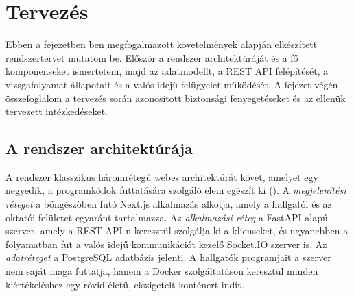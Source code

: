 \chapter{Tervezés}
\label{ch:tervezes}

Ebben a fejezetben ben megfogalmazott követelmények alapján elkészített
rendszertervet mutatom be. Először a rendszer architektúráját és a fő komponenseket ismertetem,
majd az adatmodellt, a REST API felépítését, a vizsgafolyamat állapotait és a valós idejű
felügyelet működését. A fejezet végén összefoglalom a tervezés során azonosított biztonsági
fenyegetéseket és az ellenük tervezett intézkedéseket.

\section{A rendszer architektúrája}
\label{sec:architektura}

A rendszer klasszikus háromrétegű webes architektúrát követ, amelyet egy negyedik, a programkódok
futtatására szolgáló elem egészít ki (). A \textit{megjelenítési réteget} a
böngészőben futó Next.js alkalmazás alkotja, amely a hallgatói és az oktatói felületet egyaránt
tartalmazza. Az \textit{alkalmazási réteg} a FastAPI alapú szerver, amely a REST API-n keresztül
szolgálja ki a klienseket, és ugyanebben a folyamatban fut a valós idejű kommunikációt kezelő
Socket.IO szerver is. Az \textit{adatréteget} a PostgreSQL adatbázis jelenti. A hallgatók
programjait a szerver nem saját maga futtatja, hanem a Docker szolgáltatáson keresztül minden
kiértékeléshez egy rövid életű, elszigetelt konténert indít.

